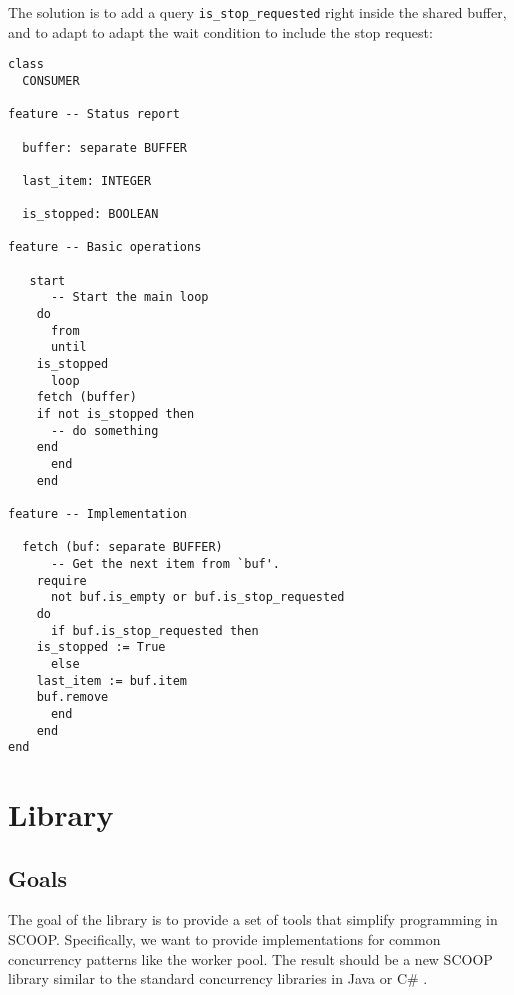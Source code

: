 \documentclass[a4paper,10pt]{article}
\newcommand{\todoref}{\todo{ref}}
\begin{document}
The solution is to add a query \lstinline!is_stop_requested! right inside the shared buffer, and to adapt to adapt the wait condition to include the stop request:

\begin{lstlisting}
class
  CONSUMER

feature -- Status report

  buffer: separate BUFFER
  
  last_item: INTEGER
  
  is_stopped: BOOLEAN
  
feature -- Basic operations
  
   start
      -- Start the main loop
    do
      from 
      until 
	is_stopped
      loop
	fetch (buffer)
	if not is_stopped then
	  -- do something
	end
      end
    end
  
feature -- Implementation

  fetch (buf: separate BUFFER)
      -- Get the next item from `buf'.
    require
      not buf.is_empty or buf.is_stop_requested
    do
      if buf.is_stop_requested then
	is_stopped := True
      else
	last_item := buf.item
	buf.remove
      end
    end
end
\end{lstlisting}
%   
%   
%       
% 


\section {Library}

 
\subsection{Goals}
\label{sec:goals}

The goal of the library is to provide a set of tools that simplify programming in SCOOP.
Specifically, we want to provide implementations for common concurrency patterns like the worker pool.
The result should be a new SCOOP library similar to the standard concurrency libraries in Java \todoref or C\# \todoref.
\end{document}
